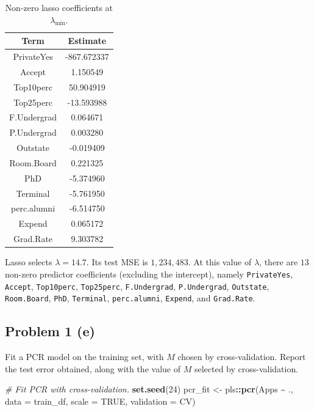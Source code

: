 \documentclass[
  10pt,
]{extarticle}
\newenvironment{Shaded}{\begin{snugshade}}{\end{snugshade}}
\newcommand{\AttributeTok}[1]{\textcolor[rgb]{0.13,0.29,0.53}{#1}}
\newcommand{\CommentTok}[1]{\textcolor[rgb]{0.56,0.35,0.01}{\textit{#1}}}
\newcommand{\ConstantTok}[1]{\textcolor[rgb]{0.56,0.35,0.01}{#1}}
\newcommand{\DecValTok}[1]{\textcolor[rgb]{0.00,0.00,0.81}{#1}}
\newcommand{\FunctionTok}[1]{\textcolor[rgb]{0.13,0.29,0.53}{\textbf{#1}}}
\newcommand{\NormalTok}[1]{#1}
\newcommand{\OtherTok}[1]{\textcolor[rgb]{0.56,0.35,0.01}{#1}}
\newcommand{\SpecialCharTok}[1]{\textcolor[rgb]{0.81,0.36,0.00}{\textbf{#1}}}
\newcommand{\StringTok}[1]{\textcolor[rgb]{0.31,0.60,0.02}{#1}}
\begin{document}
\begin{table}[H]
\centering
\caption{\label{tab:unnamed-chunk-5}Non-zero lasso coefficients at $\lambda_{\min}$.}
\centering
\begin{tabular}[t]{cc}
\toprule
Term & Estimate\\
\midrule
PrivateYes & -867.672337\\
Accept & 1.150549\\
Top10perc & 50.904919\\
Top25perc & -13.593988\\
F.Undergrad & 0.064671\\
P.Undergrad & 0.003280\\
Outstate & -0.019409\\
Room.Board & 0.221325\\
PhD & -5.374960\\
Terminal & -5.761950\\
perc.alumni & -6.514750\\
Expend & 0.065172\\
Grad.Rate & 9.303782\\
\bottomrule
\end{tabular}
\end{table}

Lasso selects \(\lambda = 14.7\). Its test MSE is \(\boxed{1{,}234{,}483}\). At this value of \(\lambda\), there are \(13\) non-zero predictor coefficients (excluding the intercept), namely \texttt{PrivateYes}, \texttt{Accept}, \texttt{Top10perc}, \texttt{Top25perc}, \texttt{F.Undergrad}, \texttt{P.Undergrad}, \texttt{Outstate}, \texttt{Room.Board}, \texttt{PhD}, \texttt{Terminal}, \texttt{perc.alumni}, \texttt{Expend}, and \texttt{Grad.Rate}.

\newpage

\subsection{Problem 1 (e)}\label{problem-1-e}

\begin{problem}[Problem 1 (e)]
Fit a PCR model on the training set, with \(M\) chosen by cross-validation. Report the test error obtained, along with the value of \(M\) selected by cross-validation.
\end{problem}

\begin{Shaded}
\begin{Highlighting}[]
\CommentTok{\# Fit PCR with cross{-}validation.}
\FunctionTok{set.seed}\NormalTok{(}\DecValTok{24}\NormalTok{)}
\NormalTok{pcr\_fit }\OtherTok{\textless{}{-}}\NormalTok{ pls}\SpecialCharTok{::}\FunctionTok{pcr}\NormalTok{(Apps }\SpecialCharTok{\textasciitilde{}}\NormalTok{ ., }\AttributeTok{data =}\NormalTok{ train\_df, }\AttributeTok{scale =} \ConstantTok{TRUE}\NormalTok{, }\AttributeTok{validation =} \StringTok{\textquotesingle{}CV\textquotesingle{}}\NormalTok{)}
\end{Highlighting}
\end{Shaded}
\end{document}
